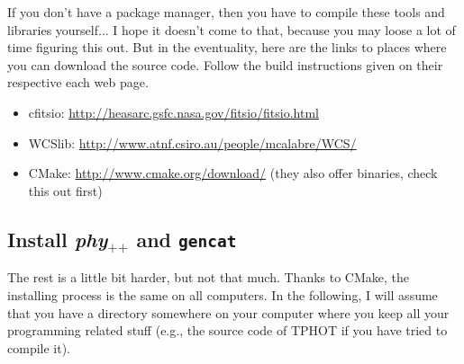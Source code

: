 \documentclass[12pt,a4paper]{article}
\newcommand{\phypp}{\textit{phy}$_{\text{++}}$\xspace}
\begin{document}
If you don't have a package manager, then you have to compile these tools and libraries yourself... I hope it doesn't come to that, because you may loose a lot of time figuring this out. But in the eventuality, here are the links to places where you can download the source code. Follow the build instructions given on their respective each web page.
\begin{itemize}
\item cfitsio: \url{http://heasarc.gsfc.nasa.gov/fitsio/fitsio.html}
\item WCSlib: \url{http://www.atnf.csiro.au/people/mcalabre/WCS/}
\item CMake: \url{http://www.cmake.org/download/} (they also offer binaries, check this out first)
\end{itemize}

\subsection{Install \phypp and \texttt{gencat}}

The rest is a little bit harder, but not that much. Thanks to CMake, the installing process is the same on all computers. In the following, I will assume that you have a directory somewhere on your computer where you keep all your programming related stuff (e.g., the source code of TPHOT if you have tried to compile it).
\end{document}

